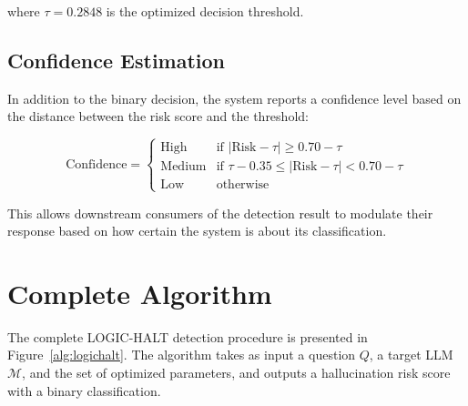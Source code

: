 \noindent
where $\tau = 0.2848$ is the optimized decision threshold.

\subsection{Confidence Estimation}

In addition to the binary decision, the system reports a confidence level based on the distance between the risk score and the threshold:

\begin{equation}
    \text{Confidence} = \begin{cases}
        \text{High} & \text{if } |\text{Risk} - \tau| \geq 0.70 - \tau \\
        \text{Medium} & \text{if } \tau - 0.35 \leq |\text{Risk} - \tau| < 0.70 - \tau \\
        \text{Low} & \text{otherwise}
    \end{cases}
\end{equation}

\noindent
This allows downstream consumers of the detection result to modulate their response based on how certain the system is about its classification.


\section{Complete Algorithm}

The complete LOGIC-HALT detection procedure is presented in Figure~\ref{alg:logichalt}. The algorithm takes as input a question $Q$, a target LLM $\mathcal{M}$, and the set of optimized parameters, and outputs a hallucination risk score with a binary classification.

